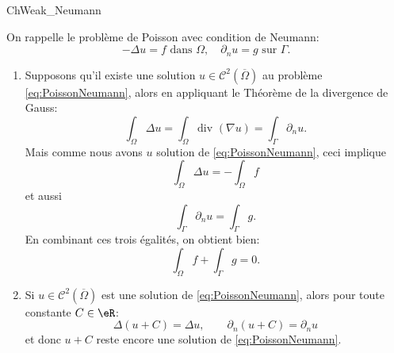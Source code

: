 \begin{corrige}{ChWeak_Neumann}


On rappelle le problème de Poisson avec condition de Neumann:
\begin{equation}\label{eq:PoissonNeumann}
- \Delta u = f \mbox{ dans } \Omega, \quad \partial_n u = g \mbox{ sur } \Gamma.
\end{equation}

\begin{enumerate}

\item Supposons qu'il existe une solution $u\in \mathcal{C}^2(\overline{\Omega})$ au problème \eqref{eq:PoissonNeumann}, alors 
en appliquant le Théorème de la divergence de Gauss:
\[
\int_\Omega \Delta u = \int_\Omega \textrm{div } (\nabla u)
= \int_\Gamma \partial_n u.
\]
Mais comme nous avons $u$ solution de \eqref{eq:PoissonNeumann}, ceci implique
\[
\int_\Omega \Delta u = - \int_\Omega f
\]
et aussi
\[
\int_\Gamma \partial_n u = \int_\Gamma g.
\]
En combinant ces trois égalités, on obtient bien:
\[
\int_\Omega f + \int_\Gamma g = 0.
\]
%
%
\item Si $u\in \mathcal{C}^2(\overline{\Omega})$ est une solution de \eqref{eq:PoissonNeumann}, alors pour toute constante $C\in\eR$:
\[
\Delta (u+C) = \Delta u, \qquad \partial_n (u+C) = \partial_n u
\]
et donc $u+C$ reste encore une solution de \eqref{eq:PoissonNeumann}.


\end{enumerate}
\end{corrige}

